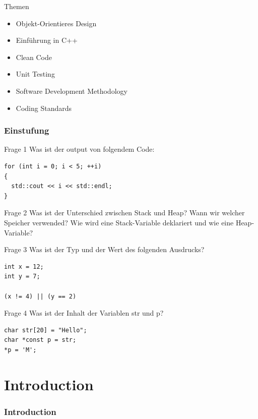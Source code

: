 \documentclass{beamer}
\begin{document}
\begin{frame}{Themen}
\begin{itemize}
  \item Objekt-Orientieres Design
  \item Einführung in C++
  \item Clean Code
  \item Unit Testing
  \item Software Development Methodology
  \item Coding Standards
\end{itemize}
\end{frame}

\section{Einstufung}
\begin{frame}[fragile]{Frage 1}
Was ist der output von folgendem Code:
\begin{lstlisting}
for (int i = 0; i < 5; ++i)
{
  std::cout << i << std::endl;
}
\end{lstlisting}
\end{frame}

\begin{frame}{Frage 2}
Was ist der Unterschied zwischen Stack und Heap? Wann wir welcher Speicher
verwended? Wie wird eine Stack-Variable deklariert und wie eine Heap-Variable?
\end{frame}

\begin{frame}[fragile]{Frage 3}
Was ist der Typ und der Wert des folgenden Ausdrucks?
\begin{lstlisting}
int x = 12;
int y = 7;

(x != 4) || (y == 2)
\end{lstlisting}
\end{frame}

\begin{frame}[fragile]{Frage 4}
Was ist der Inhalt der Variablen str und p?
\begin{lstlisting}
char str[20] = "Hello";
char *const p = str;
*p = 'M';
\end{lstlisting}
\end{frame}

\part{Introduction}

\section{Introduction}
\end{document}

